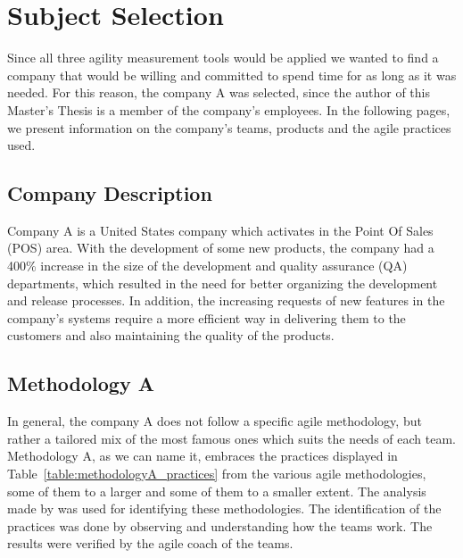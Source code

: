 \section{Subject Selection}
Since all three agility measurement tools would be applied we wanted to find a company that would be willing and committed to spend time for as long as it was needed. For this reason, the company A was selected, since the author of this Master's Thesis is a member of the company's employees. In the following pages, we present information on the company's teams, products and the agile practices used.

\subsection{Company Description}
Company A is a United States company which activates in the Point Of Sales (POS) area. With the development of some new products, the company had a 400\% increase in the size of the development and quality assurance (QA) departments, which resulted in the need for better organizing the development and release processes. In addition, the increasing requests of new features in the company's systems require a more efficient way in delivering them to the customers and also maintaining the quality of the products.

\subsection{Methodology A}
In general, the company A does not follow a specific agile methodology, but rather a tailored mix of the most famous ones which suits the needs of each team. Methodology A, as we can name it, embraces the practices displayed in Table~\ref{table:methodologyA_practices} from the various agile methodologies, some of them to a larger and some of them to a smaller extent. The analysis made by \citet{koch2005agile} was used for identifying these methodologies. The identification of the practices was done by observing and understanding how the teams work. The results were verified by the agile coach of the teams.


